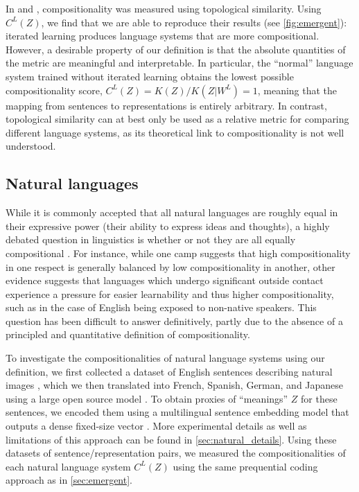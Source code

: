 \documentclass{article} %
\begin{document}
In \citet{li2019ease} and \citet{ren2020compositional}, compositionality was measured using topological similarity. Using $C^L(Z)$, we find that we are able to reproduce their results (see \cref{fig:emergent}): iterated learning produces language systems that are more compositional. However, a desirable property of our definition is that the absolute quantities of the metric are meaningful and interpretable. In particular, the ``normal'' language system trained without iterated learning obtains the lowest possible compositionality score, $C^L(Z) = K(Z) / K(Z|W^L) = 1$, meaning that the mapping from sentences to representations is entirely arbitrary. In contrast, topological similarity can at best only be used as a relative metric for comparing different language systems, as its theoretical link to compositionality is not well understood.


\subsection{Natural languages}
\label{sec:natural}

While it is commonly accepted that all natural languages are roughly equal in their expressive power (their ability to express ideas and thoughts), a highly debated question in linguistics is whether or not they are all equally compositional \citep{joseph2012all}. For instance, while one camp suggests that high compositionality in one respect is generally balanced by low compositionality in another, other evidence suggests that languages which undergo significant outside contact experience a pressure for easier learnability and thus higher compositionality, such as in the case of English being exposed to non-native speakers. This question has been difficult to answer definitively, partly due to the absence of a principled and quantitative definition of compositionality.

To investigate the compositionalities of natural language systems using our definition, we first collected a dataset of English sentences describing natural images \citep{coco-captions}, which we then translated into French, Spanish, German, and Japanese using a large open source model \citep{costa2022no}. To obtain proxies of ``meanings'' $Z$ for these sentences, we encoded them using a multilingual sentence embedding model that outputs a dense fixed-size vector \citep{reimers-2020-multilingual-sentence-bert}. More experimental details as well as limitations of this approach can be found in \cref{sec:natural_details}. 
Using these datasets of sentence/representation pairs, we measured the compositionalities of each natural language system $C^L(Z)$ using the same prequential coding approach as in \cref{sec:emergent}.
\end{document}
